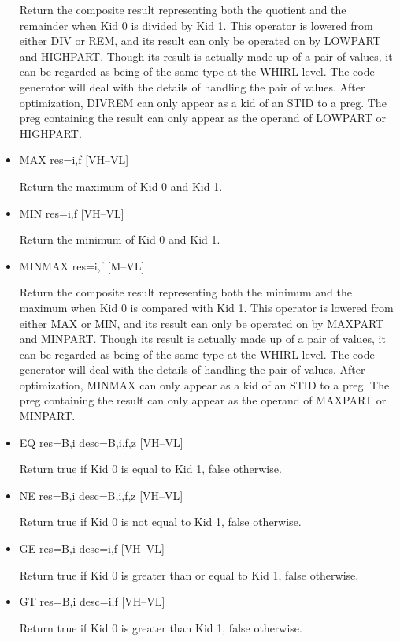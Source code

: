 \documentclass{article}
\begin{document}
\begin{itemize}
Return the composite result representing both the quotient and the
remainder when Kid 0 is divided by Kid 1. This operator is lowered
from either DIV or REM, and its result can only be operated on by
LOWPART and HIGHPART. Though its result is actually made up of a pair of
values, it can be regarded as being of the same type at the WHIRL
level. The code generator will deal with the details of handling the pair of
values. After optimization,
DIVREM can only appear as a kid of an STID to a preg. The preg
containing the result can only appear as the operand of
LOWPART or HIGHPART.

\item  MAX res=i,f \hfill [VH--VL]

Return the maximum of Kid 0 and Kid 1.

\item  MIN res=i,f \hfill [VH--VL]

Return the minimum of Kid 0 and Kid 1.

\item  MINMAX res=i,f \hfill [M--VL]

Return the composite result representing both the minimum and the
maximum when Kid 0 is compared with Kid 1. This operator is lowered
from either MAX or MIN, and its result can only be operated on by
MAXPART and
MINPART. Though its result is actually made up of a pair of values,
it can be regarded as being of the same type at the WHIRL level.
The code
generator will deal with the details of handling the pair of values.
After optimization,
MINMAX can only appear as a kid of an STID to a preg. The
preg containing the result can only appear as the operand of MAXPART
or MINPART.
\item  EQ res=B,i desc=B,i,f,z \hfill [VH--VL]

Return true if Kid 0 is equal to Kid 1, false otherwise.

\item  NE res=B,i desc=B,i,f,z \hfill [VH--VL]

Return true if Kid 0 is not equal to Kid 1, false otherwise.

\item  GE res=B,i desc=i,f \hfill [VH--VL]

Return true if Kid 0 is greater than or equal to Kid 1, false
otherwise.

\item  GT res=B,i desc=i,f \hfill [VH--VL]

Return true if Kid 0 is greater than Kid 1, false otherwise.


\end{itemize}
\end{document}
